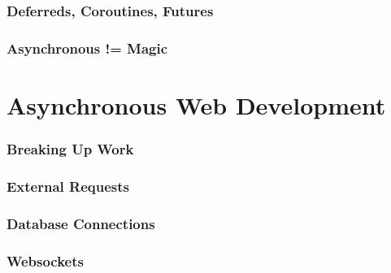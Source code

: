 \documentclass{beamer}
\begin{document}
\begin{frame}
\frametitle{Deferreds, Coroutines, Futures}
\end{frame}


\begin{frame}
\frametitle{Asynchronous != Magic}
\end{frame}


\section{Asynchronous Web Development}
\begin{frame}
\frametitle{Breaking Up Work}
\end{frame}


\begin{frame}
\frametitle{External Requests}
\end{frame}


\begin{frame}
\frametitle{Database Connections}
\end{frame}


\begin{frame}
\frametitle{Websockets}
\end{frame}
\end{document}
